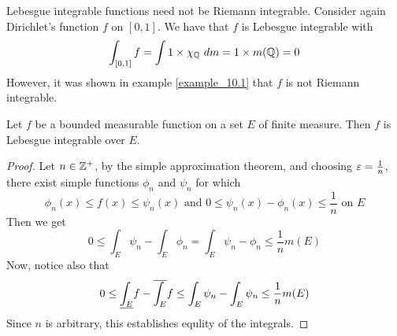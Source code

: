 \begin{example}\label{example_10.2}
    Lebesgue integrable functions need not be Riemann integrable. Consider again
    Dirichlet's function $f$ on $[0,1]$. We have that $f$ is Lebesgue integrable
    with
    \begin{equation*}
        \int_{[0,1]}{f}=\int{1 \times \chi_{\mathbb{Q}}\ dm}=1 \times m(\mathbb{Q})=0
    \end{equation*}
    However, it was shown in example \ref{example_10.1} that $f$ is not Riemann
    integrable.
\end{example}

\begin{theorem}\label{10.1.4}
    Let $f$ be a bounded measurable function on a set  $E$ of finite
    measure. Then $f$ is Lebesgue integrable over $E$.
\end{theorem}
\begin{proof}
    Let $n \in \mathbb{Z}^+$, by the simple approximation theorem, and choosing
    $\varepsilon=\frac{1}{n}$, there exist simple functions $\phi_n$ and  $\psi_n$ for
    which
    \begin{equation*}
        \phi_n(x) \leq f(x) \leq \psi_n(x) \text{ and }
        0 \leq \psi_n(x)-\phi_n(x) \leq \frac{1}{n} \text{ on } E
    \end{equation*}
    Then we get
    \begin{equation*}
        0 \leq \int_E{\psi_n}-\int_E{\phi_n}=\int_E{\psi_n-\phi_n} \leq
        \frac{1}{n}m(E)
    \end{equation*}
    Now, notice also that
    \begin{equation*}
        0 \leq \underline{\int_E}{f}-\overline{\int_E}{f} \leq
        \int_E{\psi_n}-\int_E{\psi_n}\leq \frac{1}{n}m(E)
    \end{equation*}
    Since $n$ is arbitrary, this establishes equlity of the integrals.
\end{proof}

